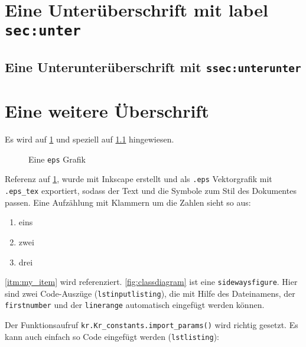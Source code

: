 \section{Eine Unterüberschrift mit label \texttt{sec:unter}}\label{sec:unter}
\subsection{Eine Unterunterüberschrift mit \texttt{ssec:unterunter}}\label{ssec:unterunter}

\section{Eine weitere Überschrift}
Es wird auf \cref{sec:unter} und speziell auf \cref{ssec:unterunter} hingewiesen.
\begin{figure}
\centering

    \caption[Eine \texttt{eps} Grafik]{Eine \texttt{eps} Grafik}
\label{fig:CombinationDrawing}
\end{figure}
Referenz auf \cref{fig:CombinationDrawing}, wurde mit Inkscape erstellt und als \texttt{.eps} Vektorgrafik mit \texttt{.eps\_tex} exportiert, sodass der Text und die Symbole zum Stil des Dokumentes passen. Eine Aufzählung mit Klammern um die Zahlen sieht so aus:
\begin{enumerate}[(1)]
    \item eins 
    \item \label{itm:my_item} zwei
    \item drei
\end{enumerate}

\begin{sidewaysfigure}
\hspace*{-0.8cm}  
\vspace{10pt}
\caption{UML Klassendiagramm}
\label{fig:classdiagram}
\end{sidewaysfigure}

\cref{itm:my_item} wird referenziert. \cref{fig:classdiagram} ist eine \texttt{sidewaysfigure}. Hier sind zwei Code-Auszüge (\texttt{lstinputlisting}), die mit Hilfe des Dateinamens, der \texttt{firstnumber} und der \texttt{linerange}  automatisch eingefügt werden können.  


Der Funktionsaufruf \texttt{kr.Kr\_constants.import\_params()} wird richtig gesetzt. Es kann auch einfach so Code eingefügt werden (\texttt{lstlisting}): 

